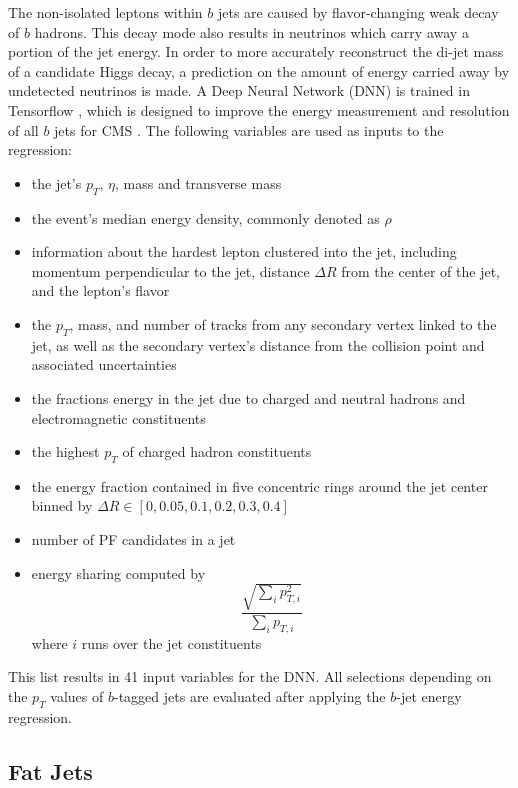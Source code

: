 The non-isolated leptons within $b$ jets are caused
by flavor-changing weak decay of $b$ hadrons.
This decay mode also results in neutrinos which carry away a portion of the jet energy.
In order to more accurately reconstruct the di-jet mass of a candidate Higgs decay,
a prediction on the amount of energy carried away by undetected neutrinos is made.
A Deep Neural Network (DNN) is trained in Tensorflow
\cite{DBLP:journals/corr/AbadiABBCCCDDDG16},
which is designed to improve the energy measurement and resolution of all $b$ jets for CMS
\cite{collaboration2019deep}.
The following variables are used as inputs to the regression:
\begin{itemize}
\item the jet's $p_T$, $\eta$, mass and transverse mass
\item the event's median energy density, commonly denoted as $\rho$
\item information about the hardest lepton clustered into the jet,
  including momentum perpendicular to the jet,
  distance $\Delta R$ from the center of the jet,
  and the lepton's flavor
\item the $p_T$, mass, and number of tracks from any secondary vertex linked to the jet,
  as well as the secondary vertex's distance from the collision point and
  associated uncertainties
\item the fractions energy in the jet due to
  charged and neutral hadrons and electromagnetic constituents
\item the highest $p_T$ of charged hadron constituents
\item the energy fraction contained in five concentric rings around the jet center
  binned by $\Delta R \in [0, 0.05, 0.1, 0.2, 0.3, 0.4]$
\item number of PF candidates in a jet
\item energy sharing computed by
  \[
  \frac{\sqrt{\sum_i p_{T,i}^2}}{\sum_i p_{T,i}}
  \]
  where $i$ runs over the jet constituents
\end{itemize}
This list results in 41 input variables for the DNN.
All selections depending on the $p_T$ values of $b$-tagged jets are evaluated after
applying the $b$-jet energy regression.

\subsection{Fat Jets}


